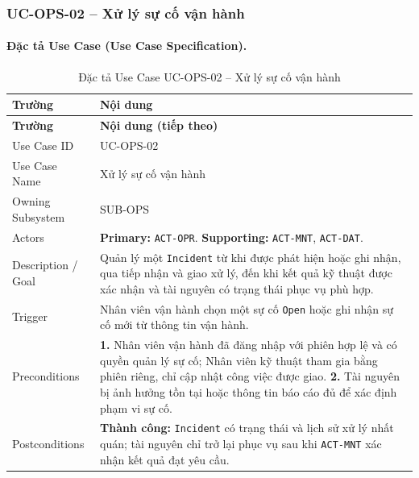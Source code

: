 \clearpage
\subsubsection{UC-OPS-02 -- Xử lý sự cố vận hành}


\paragraph{Đặc tả Use Case (Use Case Specification).}
\small
\begin{longtable}{|L{42mm}|L{102mm}|}
  \caption{Đặc tả Use Case UC-OPS-02 -- Xử lý sự cố vận hành}\label{tab:spec-UC-OPS-02}\\
  \hline
  \centering\arraybackslash\textbf{Trường} & \centering\arraybackslash\textbf{Nội dung}\\
  \hline
  \endfirsthead
  \hline
  \centering\arraybackslash\textbf{Trường} & \centering\arraybackslash\textbf{Nội dung (tiếp theo)}\\
  \hline
  \endhead
  Use Case ID & UC-OPS-02\\\hline
  Use Case Name & Xử lý sự cố vận hành\\\hline
  Owning Subsystem & SUB-OPS\\\hline
  Actors & \textbf{Primary:} \texttt{ACT-OPR}. \textbf{Supporting:} \texttt{ACT-MNT}, \texttt{ACT-DAT}.\\\hline
  Description / Goal & Quản lý một \texttt{Incident} từ khi được phát hiện hoặc ghi nhận, qua tiếp nhận và giao xử lý, đến khi kết quả kỹ thuật được xác nhận và tài nguyên có trạng thái phục vụ phù hợp.\\\hline
  Trigger & Nhân viên vận hành chọn một sự cố \texttt{Open} hoặc ghi nhận sự cố mới từ thông tin vận hành.\\\hline
  Preconditions &
    \textbf{1.} Nhân viên vận hành đã đăng nhập với phiên hợp lệ và có quyền quản lý sự cố; Nhân viên kỹ thuật tham gia bằng phiên riêng, chỉ cập nhật công việc được giao.\newline
    \textbf{2.} Tài nguyên bị ảnh hưởng tồn tại hoặc thông tin báo cáo đủ để xác định phạm vi sự cố.\\\hline
  Postconditions &
    \textbf{Thành công:} \texttt{Incident} có trạng thái và lịch sử xử lý nhất quán; tài nguyên chỉ trở lại phục vụ sau khi \texttt{ACT-MNT} xác nhận kết quả đạt yêu cầu.\newline

\end{longtable}
